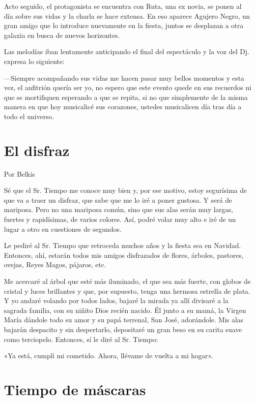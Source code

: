 \documentclass[11pt,twoside,openright,a5paper]{book}
\begin{document}
Acto seguido, el protagonista se encuentra con Ruta, una ex novia, se ponen al día sobre sus vidas y la charla se hace extensa. En eso aparece Agujero Negro, un gran amigo que lo introduce nuevamente en la fiesta, juntos se desplazan a otra galaxia en busca de nuevos horizontes.

Las melodías iban lentamente anticipando el final del espectáculo y la voz del Dj. expresa lo siguiente:

---Siempre acompañando sus vidas me hacen pasar muy bellos momentos y esta vez, el anfitrión quería ser yo, no espero que este evento quede en sus recuerdos ni que se mortifiquen esperando a que se repita, si no que simplemente de la misma manera en que hoy musicalicé sus corazones, ustedes musicalicen día tras día a todo el universo.
\clearpage
\section*{El disfraz}

\begin{flushright}Por Belkis\end{flushright}

Sé que el Sr. Tiempo me conoce muy bien y, por ese motivo, estoy segurísima de que va a traer un disfraz, que sabe que me lo iré a poner gustosa. Y será de mariposa. Pero no una mariposa común, sino que sus alas serán muy largas, fuertes y rapidísimas, de varios colores. Así, podré volar muy alto e iré de un lugar a otro en cuestiones de segundos. 

Le pediré al Sr. Tiempo que retroceda muchos años y la fiesta sea en Navidad. Entonces, ahí, estarán todos mis amigos disfrazados de flores,  árboles, pastores, ovejas, Reyes Magos, pájaros, etc.

Me acercaré al árbol que esté más iluminado, el que sea más fuerte, con globos de cristal y luces brillantes y que, por supuesto, tenga una hermosa estrella de plata. Y yo andaré volando por todos lados, bajaré la mirada ya allí divisaré a la sagrada familia, con su niñito Dios recién nacido. Él junto a su mamá, la Virgen María dándole todo su amor y su papá terrenal, San José, adorándole. Mis alas bajarán despacito y sin despertarlo, depositaré un gran beso en su carita suave como terciopelo. Entonces, sí le diré al Sr. Tiempo: 

«Ya está, cumplí mi cometido. Ahora, llévame de vuelta a mi hogar».

\section*{Tiempo de máscaras}
\end{document}

